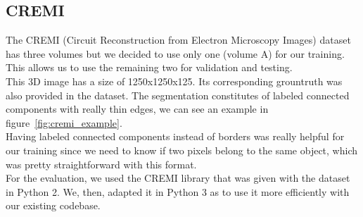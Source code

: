 \subsection{CREMI}
The CREMI (Circuit Reconstruction from Electron Microscopy Images) dataset has three volumes but we decided to use only one (volume A) for our training.
This allows us to use the remaining two for validation and testing.\\
This 3D image has a size of 1250x1250x125. Its corresponding grountruth was also provided in the dataset. 
The segmentation constitutes of labeled connected components with really thin
edges, we can see an example in figure~\ref{fig:cremi_example}.\\
Having labeled connected components instead of borders was really helpful for
our training since we need to know if two pixels belong to the same object,
which was pretty straightforward with this format.\\
For the evaluation, we used the CREMI library that was given with the dataset
in Python 2. We, then, adapted it in Python 3 as to use it more efficiently
with our existing codebase.\\

